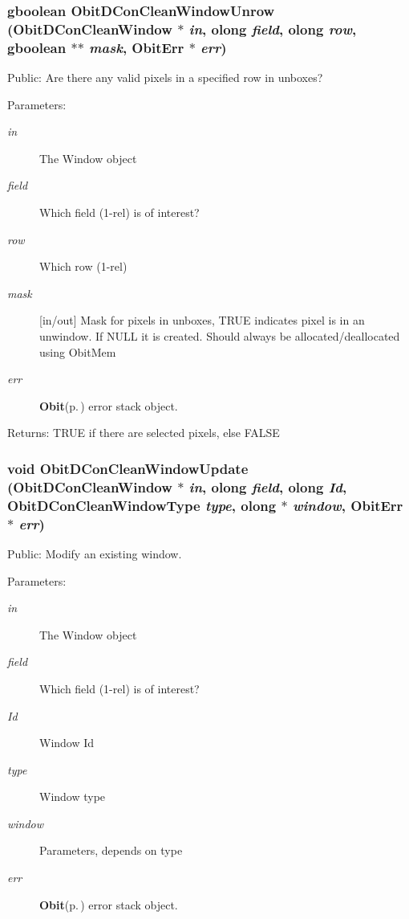 \subsubsection{\setlength{\rightskip}{0pt plus 5cm}gboolean Obit\-DCon\-Clean\-Window\-Unrow ({\bf Obit\-DCon\-Clean\-Window} $\ast$ {\em in}, {\bf olong} {\em field}, {\bf olong} {\em row}, gboolean $\ast$$\ast$ {\em mask}, {\bf Obit\-Err} $\ast$ {\em err})}\label{ObitDConCleanWindow_8h_a41}


Public: Are there any valid pixels in a specified row in unboxes? 

\begin{Desc}
\item[Parameters:]
\begin{description}
\item[{\em in}]The Window object \item[{\em field}]Which field (1-rel) is of interest? \item[{\em row}]Which row (1-rel) \item[{\em mask}][in/out] Mask for pixels in unboxes, TRUE indicates pixel is in an unwindow. If NULL it is created. Should always be allocated/deallocated using Obit\-Mem \item[{\em err}]{\bf Obit}{\rm (p.\,\pageref{structObit})} error stack object. \end{description}
\end{Desc}
\begin{Desc}
\item[Returns:]TRUE if there are selected pixels, else FALSE \end{Desc}
\subsubsection{\setlength{\rightskip}{0pt plus 5cm}void Obit\-DCon\-Clean\-Window\-Update ({\bf Obit\-DCon\-Clean\-Window} $\ast$ {\em in}, {\bf olong} {\em field}, {\bf olong} {\em Id}, {\bf Obit\-DCon\-Clean\-Window\-Type} {\em type}, {\bf olong} $\ast$ {\em window}, {\bf Obit\-Err} $\ast$ {\em err})}\label{ObitDConCleanWindow_8h_a36}


Public: Modify an existing window. 

\begin{Desc}
\item[Parameters:]
\begin{description}
\item[{\em in}]The Window object \item[{\em field}]Which field (1-rel) is of interest? \item[{\em Id}]Window Id \item[{\em type}]Window type \item[{\em window}]Parameters, depends on type \item[{\em err}]{\bf Obit}{\rm (p.\,\pageref{structObit})} error stack object. \end{description}
\end{Desc}
